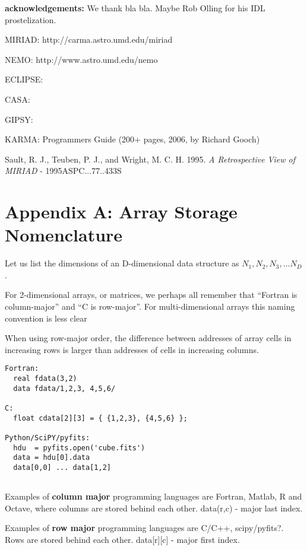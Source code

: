 \documentclass[preprint]{aastex} %
\begin{document}
{\bf acknowledgements:} We thank bla bla. Maybe Rob Olling for his IDL
prostelization.

\begin{references}



MIRIAD: http://carma.astro.umd.edu/miriad

NEMO: http://www.astro.umd.edu/nemo

ECLIPSE:

CASA:

GIPSY:

KARMA:  Programmers Guide (200+ pages, 2006, by Richard Gooch)

Sault, R. J., Teuben, P. J., and Wright, M. C. H. 1995. {\it A Retrospective View of MIRIAD} - 1995ASPC...77..433S

\end{references}


\section*{Appendix A: Array Storage Nomenclature}

Let us list the dimensions of an D-dimensional data structure
as $N_1, N_2, N_3, ... N_D$.


For 2-dimensional arrays, or matrices, we perhaps
all remember that ``Fortran is column-major'' and ``C is row-major''. For
multi-dimensional arrays this naming convention is less clear

When using row-major order, the difference between addresses of array
cells in increasing rows is larger than addresses of cells in
increasing columns.


\footnotesize
\begin{verbatim}
Fortran:
  real fdata(3,2)
  data fdata/1,2,3, 4,5,6/

C:
  float cdata[2][3] = { {1,2,3}, {4,5,6} };

Python/SciPY/pyfits:
  hdu  = pyfits.open('cube.fits')
  data = hdu[0].data
  data[0,0] ... data[1,2]
       
\end{verbatim}
\normalsize

Examples of {\bf column major} programming
languages are Fortran, Matlab, R and Octave, where columns are stored 
behind each other.   data(r,c) - major last index.

Examples of {\bf row major} programming 
languages are C/C++, scipy/pyfits?.  Rows are stored behind each other.
data[r][c] - major first index.
\end{document}
